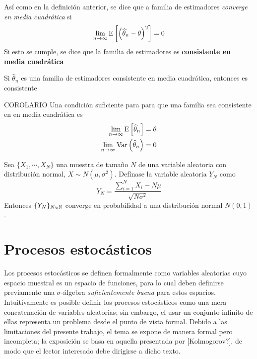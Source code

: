 \begin{definicion}
Así como en la definición anterior, se dice que a familia de estimadores \textit{converge en media cuadrática} si
\begin{equation}
\lim_{n\rightarrow\infty} \mathrm{E}\left[ \left( \widehat{\theta}_n - \theta \right)^{2} \right] = 0
\end{equation}
Si esto se cumple, se dice que la familia de estimadores es \textbf{consistente en media cuadrática} \end{definicion}

\begin{proposicion}
Si $\widehat{\theta}_n$ es una familia de estimadores consistente en media cuadrática, entonces es consistente
\end{proposicion}

\begin{proposicion} COROLARIO
Una condición suficiente para para que una familia sea consistente en en media cuadrática es
\begin{align}
\lim_{n\rightarrow\infty} \mathrm{E}\left[ \widehat{\theta}_n \right] &= \theta \\
\lim_{n\rightarrow\infty} \mathrm{Var}\left( \widehat{\theta}_n \right) &= 0
\end{align}
\end{proposicion}


\begin{teorema}
Sea $\{ X_1, \cdots, X_N\}$ una muestra de tamaño $N$ de una variable aleatoria con distribución normal, $X\sim N(\mu,\sigma^{2})$. Defínase la variable aleatoria $Y_N$ como
\begin{equation}
Y_N = \frac{\sum_{i=1}^{N}X_i - N \mu}{\sqrt{N \sigma^{2}}}
\end{equation}
Entonces $\{ Y_N \}_{N \in \mathbb{N}}$ converge en probabilidad a una distribución normal $N(0,1)$.
\end{teorema}



\section{Procesos estocásticos}

Los procesos estocásticos se definen formalmente como variables aleatorias cuyo espacio muestral es un espacio de funciones, para lo cual deben definirse previamente una $\sigma$-álgebra \textit{suficientemente buena} para estos espacios.
%
Intuitivamente es posible definir %
los procesos estocásticos como una mera concatenación de variables aleatorias; sin embargo, el usar un conjunto infinito de ellas representa un problema desde el punto de vista formal.
%
Debido a las limitaciones del presente trabajo, el tema se expone de manera formal pero incompleta; la exposición se basa en aquella presentada por [Kolmogorov?], de modo que el lector interesado debe dirigirse a dicho texto.

